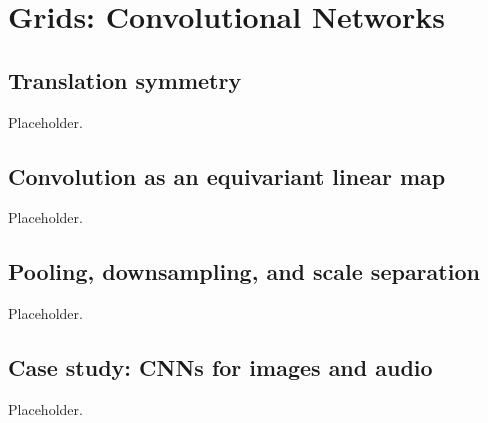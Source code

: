 \chapter{Grids: Convolutional Networks}
\label{ch:grids}

\section{Translation symmetry}
Placeholder.

\section{Convolution as an equivariant linear map}
Placeholder.

\section{Pooling, downsampling, and scale separation}
Placeholder.

\section{Case study: CNNs for images and audio}
Placeholder.
